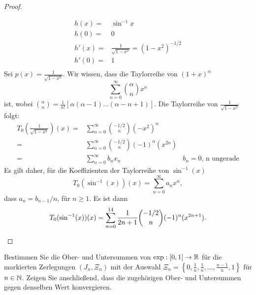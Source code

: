 \begin{proof}
\begin{parts}
		{\allowdisplaybreaks
		\begin{align*}
			h(x)=& \sin^{-1}x\\
			h(0)=&0\\
			h'(x)=&\frac{1}{\sqrt{1-x^2} }=(1-x^2)^{-1 / 2}\\
			h'(0)=&1\\
		\end{align*}
		Sei $p(x)=\frac{1}{\sqrt{1-x^2} }$. Wir wissen, dass die Taylorreihe von $(1+x)^\alpha$
		\begin{equation}\tag{5.6.41}
			\sum_{n=0}^{\infty} \binom{\alpha}{n}x^n
		\end{equation}
		ist, wobei $\binom{\alpha}{n}=\frac{1}{n!}\left[ \alpha(\alpha-1)\dots(\alpha-n+1) \right] $. Die Taylorreihe von $\frac{1}{\sqrt{1-x^2} }$ folgt:
		\begin{align*}
			T_{0}\left( \frac{1}{\sqrt{1-x^2} } \right)(x)=& \sum_{n=0}^{\infty} \binom{-1 / 2}{n}\left( -x^2 \right)^n\\
			=& \sum_{n=0}^{\infty} \binom{-1 / 2}{n}(-1)^n(x^{2n})\\
			=& \sum_{n=0}^{\infty} b_n x_n & b_n=0\text{, n ungerade}
\end{align*}
		Es gilt daher, f\"{u}r die Koeffizienten der Taylorreihe von $\sin^{-1}(x)$
		 \[
			 T_{0}(\sin^{-1}(x))(x)=\sum_{n=0}^{\infty} a_n x^n
		,\] 
		dass $a_n=b_{n-1} / n$, f\"{u}r $n\ge 1$. Es ist dann
		 \[
			 T_{0}(\sin^{-1}(x))(x)=\sum_{n=0}^{14} \frac{1}{2n+1}\binom{-1 / 2}{n}(-1)^n(x^{2n+1})
		.\qedhere\] 
	}
	\end{parts}
\end{proof}
\begin{Problem}
	Bestimmen Sie die Ober- und Untersummen von $\exp : [0, 1] \to\mathbb{R}$ für die markierten Zerlegungen $(J_n, \Xi_n)$ mit der Auswahl $\Xi_n = \left\{ 0,\frac{1}{n},\frac{1}{n},\dots,\frac{n-1}{n},1 \right\} $ für $n \in \mathbb{N}$. Zeigen Sie anschließend, dass die zugehörigen Ober- und Untersummen gegen denselben Wert konvergieren.
\end{Problem}

